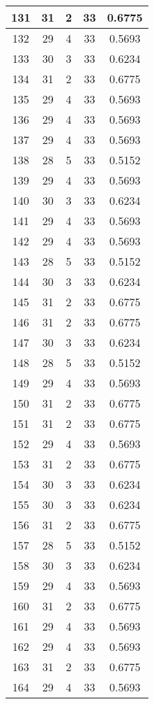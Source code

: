 \documentclass[letterpaper, 12pt]{article}
\begin{document}
\begin{longtable}{|c|c|c|c|c|}
\hline
131 & 31 & 2 & 33 & 0.6775 \\
\hline
132 & 29 & 4 & 33 & 0.5693 \\
\hline
133 & 30 & 3 & 33 & 0.6234 \\
\hline
134 & 31 & 2 & 33 & 0.6775 \\
\hline
135 & 29 & 4 & 33 & 0.5693 \\
\hline
136 & 29 & 4 & 33 & 0.5693 \\
\hline
137 & 29 & 4 & 33 & 0.5693 \\
\hline
138 & 28 & 5 & 33 & 0.5152 \\
\hline
139 & 29 & 4 & 33 & 0.5693 \\
\hline
140 & 30 & 3 & 33 & 0.6234 \\
\hline
141 & 29 & 4 & 33 & 0.5693 \\
\hline
142 & 29 & 4 & 33 & 0.5693 \\
\hline
143 & 28 & 5 & 33 & 0.5152 \\
\hline
144 & 30 & 3 & 33 & 0.6234 \\
\hline
145 & 31 & 2 & 33 & 0.6775 \\
\hline
146 & 31 & 2 & 33 & 0.6775 \\
\hline
147 & 30 & 3 & 33 & 0.6234 \\
\hline
148 & 28 & 5 & 33 & 0.5152 \\
\hline
149 & 29 & 4 & 33 & 0.5693 \\
\hline
150 & 31 & 2 & 33 & 0.6775 \\
\hline
151 & 31 & 2 & 33 & 0.6775 \\
\hline
152 & 29 & 4 & 33 & 0.5693 \\
\hline
153 & 31 & 2 & 33 & 0.6775 \\
\hline
154 & 30 & 3 & 33 & 0.6234 \\
\hline
155 & 30 & 3 & 33 & 0.6234 \\
\hline
156 & 31 & 2 & 33 & 0.6775 \\
\hline
157 & 28 & 5 & 33 & 0.5152 \\
\hline
158 & 30 & 3 & 33 & 0.6234 \\
\hline
159 & 29 & 4 & 33 & 0.5693 \\
\hline
160 & 31 & 2 & 33 & 0.6775 \\
\hline
161 & 29 & 4 & 33 & 0.5693 \\
\hline
162 & 29 & 4 & 33 & 0.5693 \\
\hline
163 & 31 & 2 & 33 & 0.6775 \\
\hline
164 & 29 & 4 & 33 & 0.5693 \\

\end{longtable}
\end{document}
